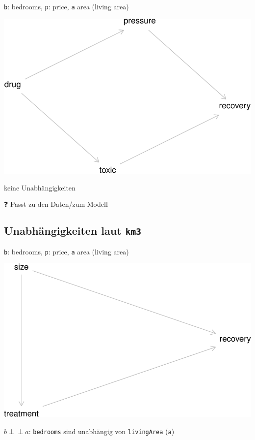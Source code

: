 \documentclass[
  a4paper,
  DIV=11]{scrreprt}
\theoremstyle{definition}
\theoremstyle{remark}
\begin{document}
\texttt{b}: bedrooms, \texttt{p}: price, \texttt{a} area (living area)

\includegraphics{./kausal_files/figure-pdf/unnamed-chunk-7-1.pdf}

keine Unabhängigkeiten

❓ Passt zu den Daten/zum Modell

\hypertarget{unabhuxe4ngigkeiten-laut-km3}{%
\subsection{\texorpdfstring{Unabhängigkeiten laut
\texttt{km3}}{Unabhängigkeiten laut km3}}\label{unabhuxe4ngigkeiten-laut-km3}}

\texttt{b}: bedrooms, \texttt{p}: price, \texttt{a} area (living area)

\includegraphics{./kausal_files/figure-pdf/unnamed-chunk-8-1.pdf}

\(b \perp \!\!\! \perp a\): \texttt{bedrooms} sind unabhängig von
\texttt{livingArea} (\texttt{a})
\end{document}
